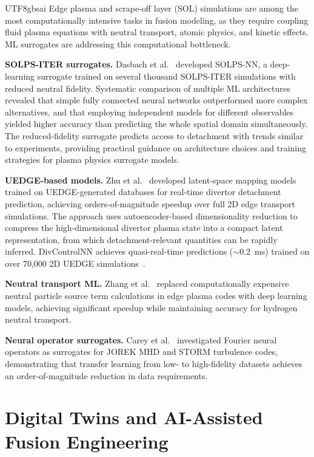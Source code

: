 \documentclass[12pt,a4paper]{article}
\begin{document}
\begin{CJK}{UTF8}{gbsai}
Edge plasma and scrape-off layer (SOL) simulations are among the most computationally intensive tasks in fusion modeling, as they require coupling fluid plasma equations with neutral transport, atomic physics, and kinetic effects. ML surrogates are addressing this computational bottleneck.

\textbf{SOLPS-ITER surrogates.} Dasbach et al.~\citep{Dasbach2026} developed SOLPS-NN, a deep-learning surrogate trained on several thousand SOLPS-ITER simulations with reduced neutral fidelity. Systematic comparison of multiple ML architectures revealed that simple fully connected neural networks outperformed more complex alternatives, and that employing independent models for different observables yielded higher accuracy than predicting the whole spatial domain simultaneously. The reduced-fidelity surrogate predicts access to detachment with trends similar to experiments, providing practical guidance on architecture choices and training strategies for plasma physics surrogate models.

\textbf{UEDGE-based models.} Zhu et al.~\citep{Zhu2025Latent} developed latent-space mapping models trained on UEDGE-generated databases for real-time divertor detachment prediction, achieving orders-of-magnitude speedup over full 2D edge transport simulations. The approach uses autoencoder-based dimensionality reduction to compress the high-dimensional divertor plasma state into a compact latent representation, from which detachment-relevant quantities can be rapidly inferred. DivControlNN achieves quasi-real-time predictions ($\sim$0.2~ms) trained on over 70,000 2D UEDGE simulations~\citep{DivControlNN2025}.

\textbf{Neutral transport ML.} Zhang et al.~\citep{Zhang2025Neutral} replaced computationally expensive neutral particle source term calculations in edge plasma codes with deep learning models, achieving significant speedup while maintaining accuracy for hydrogen neutral transport.

\textbf{Neural operator surrogates.} Carey et al.~\citep{Carey2025} investigated Fourier neural operators as surrogates for JOREK MHD and STORM turbulence codes, demonstrating that transfer learning from low- to high-fidelity datasets achieves an order-of-magnitude reduction in data requirements.

\section{Digital Twins and AI-Assisted Fusion Engineering}


\end{CJK}
\end{document}
